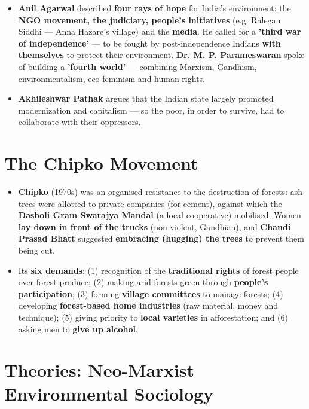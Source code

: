 \begin{KeyConcept}
\begin{itemize}
\item \textbf{Anil Agarwal} described \textbf{four rays of hope} for India's environment: the \textbf{NGO movement, the judiciary, people's initiatives} (e.g. Ralegan Siddhi --- Anna Hazare's village) and the \textbf{media}. He called for a \textbf{'third war of independence'} --- to be fought by post-independence Indians \textbf{with themselves} to protect their environment. \textbf{Dr. M. P. Parameswaran} spoke of building a \textbf{'fourth world'} --- combining Marxism, Gandhism, environmentalism, eco-feminism and human rights.
\item \textbf{Akhileshwar Pathak} argues that the Indian state largely promoted modernization and capitalism --- so the poor, in order to survive, had to collaborate with their oppressors.
\end{itemize}
\end{KeyConcept}

\section{The Chipko Movement}

\begin{KeyConcept}
\begin{itemize}
\item \textbf{Chipko} (1970s) was an organised resistance to the destruction of forests: ash trees were allotted to private companies (for cement), against which the \textbf{Dasholi Gram Swarajya Mandal} (a local cooperative) mobilised. Women \textbf{lay down in front of the trucks} (non-violent, Gandhian), and \textbf{Chandi Prasad Bhatt} suggested \textbf{embracing (hugging) the trees} to prevent them being cut.
\item Its \textbf{six demands}: (1) recognition of the \textbf{traditional rights} of forest people over forest produce; (2) making arid forests green through \textbf{people's participation}; (3) forming \textbf{village committees} to manage forests; (4) developing \textbf{forest-based home industries} (raw material, money and technique); (5) giving priority to \textbf{local varieties} in afforestation; and (6) asking men to \textbf{give up alcohol}.
\end{itemize}
\end{KeyConcept}

\section{Theories: Neo-Marxist Environmental Sociology}

